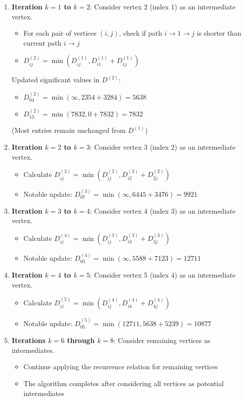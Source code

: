 \documentclass{article}
\theoremstyle{definition}
\begin{document}
\begin{enumerate}
\item \textbf{Iteration $k=1$ to $k=2$}: Consider vertex 2 (index 1) as an intermediate vertex.
   \begin{itemize}
   \item For each pair of vertices $(i,j)$, check if path $i \rightarrow 1 \rightarrow j$ is shorter than current path $i \rightarrow j$
   \item $D^{(2)}_{ij} = \min(D^{(1)}_{ij}, D^{(1)}_{i1} + D^{(1)}_{1j})$
   \end{itemize}

   Updated significant values in $D^{(2)}$:
   \begin{itemize}
   \item $D^{(2)}_{04} = \min(\infty, 2354 + 3284) = 5638$
   \item $D^{(2)}_{13} = \min(7832, 0 + 7832) = 7832$
   \end{itemize}
   (Most entries remain unchanged from $D^{(1)}$)

\item \textbf{Iteration $k=2$ to $k=3$}: Consider vertex 3 (index 2) as an intermediate vertex.
   \begin{itemize}
   \item Calculate $D^{(3)}_{ij} = \min(D^{(2)}_{ij}, D^{(2)}_{i2} + D^{(2)}_{2j})$
   \item Notable update: $D^{(3)}_{07} = \min(\infty, 6445 + 3476) = 9921$
   \end{itemize}

\item \textbf{Iteration $k=3$ to $k=4$}: Consider vertex 4 (index 3) as an intermediate vertex.
   \begin{itemize}
   \item Calculate $D^{(4)}_{ij} = \min(D^{(3)}_{ij}, D^{(3)}_{i3} + D^{(3)}_{3j})$
   \item Notable update: $D^{(4)}_{05} = \min(\infty, 5588 + 7123) = 12711$
   \end{itemize}

\item \textbf{Iteration $k=4$ to $k=5$}: Consider vertex 5 (index 4) as an intermediate vertex.
   \begin{itemize}
   \item Calculate $D^{(5)}_{ij} = \min(D^{(4)}_{ij}, D^{(4)}_{i4} + D^{(4)}_{4j})$
   \item Notable update: $D^{(5)}_{05} = \min(12711, 5638 + 5239) = 10877$
   \end{itemize}

\item \textbf{Iterations $k=6$ through $k=8$}: Consider remaining vertices as intermediates.
   \begin{itemize}
   \item Continue applying the recurrence relation for remaining vertices
   \item The algorithm completes after considering all vertices as potential intermediates
   \end{itemize}
\end{enumerate}
\end{document}

